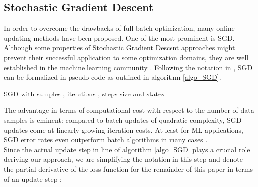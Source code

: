\documentclass{acm_proc_article-sp}
\begin{document}
\subsection{Stochastic Gradient Descent}
In order to overcome the drawbacks of full batch optimization, many online 
updating methods have been proposed. One of the most prominent is SGD.
Although some properties of Stochastic Gradient Descent approaches might  
prevent their successful application to some optimization 
domains, they are well established in the machine learning community 
\cite{bottou2010large}.   
Following the notation in \cite{SGDsmola}, SGD can be formalized
in pseudo code as outlined in algorithm \ref{algo_SGD}. 
\begin{algorithm}
\caption{SGD with samples , iterations , steps size 
 and states }
\label{algo_SGD}
\begin{algorithmic}[1]
\Require{}
\ForAll{ } 
\EndFor
\State{\Return }
\end{algorithmic}
\end{algorithm}
The advantage in terms of computational cost with respect to the number of data 
samples is eminent: 
compared to batch updates of quadratic complexity,
SGD updates come at linearly growing iteration costs. At least for ML-applications, 
SGD error rates even outperform batch algorithms in many cases \cite{bottou2010large}.\\  

Since the actual update step in line  of algorithm \ref{algo_SGD} plays a 
crucial role deriving our approach, we are simplifying the notation in this
step and denote the partial derivative of the loss-function for the remainder 
of this paper in terms of
an update step : 
\end{document}

